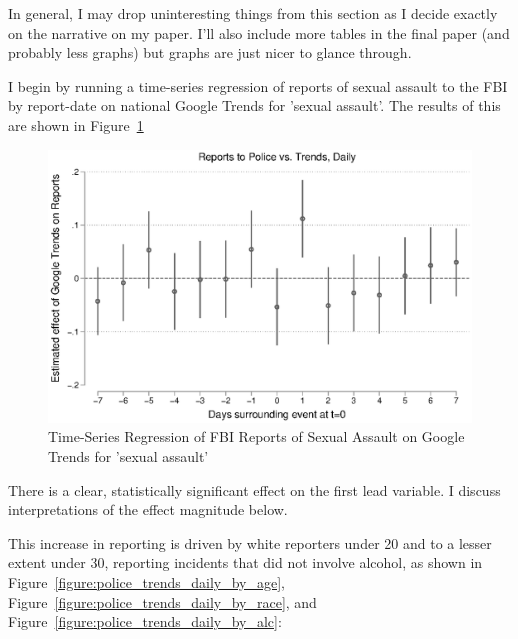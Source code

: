 \documentclass[AER,draftmode]{AEA}
\begin{document}
In general, I may drop uninteresting things from this section as I decide exactly on the narrative on my paper. I'll also include more tables in the final paper (and probably less graphs) but graphs are just nicer to glance through.

I begin by running a time-series regression of reports of sexual assault to the FBI by report-date on national Google Trends for 'sexual assault'. The results of this are shown in Figure~\ref{figure:police_trends_daily}

\begin{figure}
\includegraphics[width=\linewidth]{figures/police_trend_daily.eps}
\caption{Time-Series Regression of FBI Reports of Sexual Assault on Google Trends for 'sexual assault'} \label{figure:police_trends_daily}
\end{figure}

There is a clear, statistically significant effect on the first lead variable.  I discuss interpretations of the effect magnitude below. 

This increase in reporting is driven by white reporters under 20 and to a lesser extent under 30, reporting incidents that did not involve alcohol, as shown in Figure~\ref{figure:police_trends_daily_by_age}, Figure~\ref{figure:police_trends_daily_by_race}, and Figure~\ref{figure:police_trends_daily_by_alc}:
\end{document}
